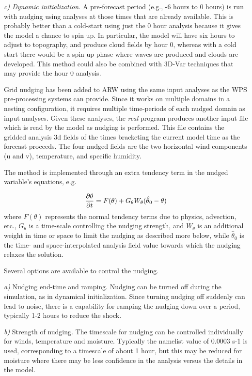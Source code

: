 {\it c) Dynamic initialization.} A pre-forecast period (e.g., -6 hours to 0 hours) is run with nudging using analyses at those times that are already available. This is probably better than a cold-start using just the 0 hour analysis because it gives the model a chance to spin up. In particular, the model will have six hours to adjust to topography, and produce cloud fields by hour 0, whereas with a cold start there would be a spin-up phase where waves are produced and clouds are developed. This method could also be combined with 3D-Var techniques that may provide the hour 0 analysis.

Grid nudging has been added to ARW using the same input analyses as the WPS pre-processing systems can provide. Since it works on multiple domains in a nesting configuration, it requires multiple time-periods of each nudged domain as input analyses. Given these analyses, the {\it real} program produces another input file which is read by the model as nudging is performed. This file contains the gridded analysis 3d fields of the times bracketing the current model time as the forecast proceeds. The four nudged fields are the two horizontal wind components (u and v), temperature, and specific humidity. 

The method is implemented through an extra tendency term in the nudged variable's equations, e.g.

$$ {\partial \theta \over \partial t} = F(\theta) + G_{\theta} W_{\theta} ( \hat \theta_0 - \theta)  $$
where $F(\theta)$ represents the normal tendency terms due to physics, advection, etc., $G_{\theta}$ is a time-scale controlling the nudging strength, and $W_{\theta}$ is an additional weight in time or space to limit the nudging as described more below, while $\hat \theta_0$ is the time- and space-interpolated analysis field value towards which the nudging relaxes the solution.

Several options are available to control the nudging.

{\it a)} Nudging end-time and ramping. Nudging can be turned off during the simulation, as in dynamical initialization. Since turning nudging off suddenly can lead to noise, there is a capability for ramping the nudging down over a period, typically 1-2 hours to reduce the shock.

{\it b)} Strength of nudging. The timescale for nudging can be controlled individually for winds, temperature and moisture. Typically the namelist value of  0.0003 s-1 is used, corresponding to a timescale of about 1 hour, but this may be reduced for moisture where there may be less confidence in the analysis versus the details in the model.

